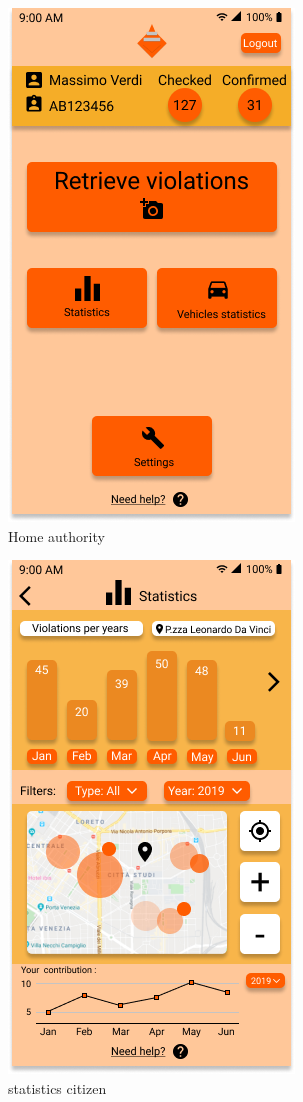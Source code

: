 \documentclass{article}
\begin{document}
\begin{figure}[h!]
    \centering
    \includegraphics[scale=0.5]{img/mockups/home_authority.png}
    \caption{Home authority}
\end{figure}

\begin{figure}[h!]
    \centering
    \includegraphics[scale=0.5]{img/mockups/statistics_citizen.png}
    \caption{statistics citizen}
\end{figure}
\end{document}
